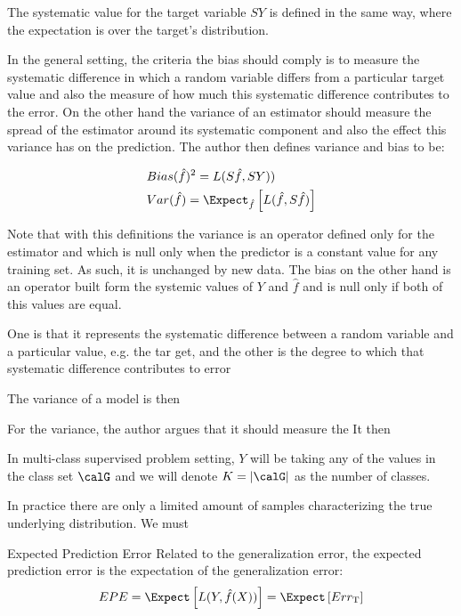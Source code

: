  The systematic value for the target variable $SY$ is defined in the same way, where the expectation is over the target's distribution. 
 
 In the general setting, the criteria the bias should comply is to measure the systematic difference in which a random variable differs from a particular target value and also the measure of how much this systematic difference contributes to the error. On the other hand the variance of an estimator should measure the spread of the estimator around its systematic component and also the effect this variance has on the prediction. The author then defines variance and bias to be:
 
 \begin{equation}
 \begin{split}
 & Bias(\hat{f})^2 = L(S\hat{f},SY)) \\
 & Var(\hat{f}) = \Expect_{\hat{f}} \left[  L(\hat{f}  , S\hat{f}) \right]
 \end{split}
 \end{equation}
 
 Note that with this definitions the variance is an operator defined only for the estimator and which is null only when the predictor is a constant value for any training set. As such, it is unchanged by new data. The bias on the other hand is an operator built form the systemic values of $Y$ and $\hat{f}$ and is null only if both of this values are equal.
 
 One is that it represents the systematic difference between a random
 variable and a particular value, e.g. the tar get, and the other is the degree
 to which that systematic difference contributes to error
 
 The variance of a model is then 
 
 For the variance, the author argues that it should measure the 
 It then 
 
 In multi-class supervised problem setting, $Y$ will be taking any of the values in the class set $\calG$ and we will denote $K = |\calG|$ as the number of classes.
 
 
 In practice there are only a limited amount of samples characterizing the true underlying distribution. We must 
 
 \begin{definition}{Expected Prediction Error}
 	Related to the generalization error, the expected prediction error is the expectation of the generalization error:
 	$$ EPE = \Expect \left[ L(Y,\hat{f}(X))\right] =  \Expect \left[ Err_{\mathrm{T}}  \right]$$
 \end{definition}
 
